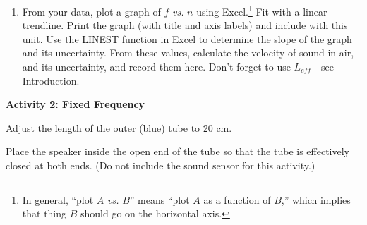 \begin{enumerate}[labparts]
\item From your data, plot a graph of $f$ \textit{vs.} $n$ using Excel.\footnote{In general, ``plot $A$ \textit{vs.} $B$'' means ``plot $A$ as a function of $B$,'' which implies that thing $B$ should go on the horizontal axis.} Fit with a linear trendline. Print the graph (with title and axis labels) and include with this unit. Use the LINEST function in Excel to determine the slope of the graph and its uncertainty. From these values, calculate the velocity of sound in air, and its uncertainty, and record them here. Don't forget to use $L_{eff}$ - see Introduction.
\vspace{12mm}

\end{enumerate}





\textbf{Activity 2: Fixed Frequency} 


\item Adjust the length of the outer (blue) tube to 20 cm.

\item Place the speaker inside the open end of the tube so that the tube is effectively closed at both ends. (Do not include the sound sensor for this activity.)

